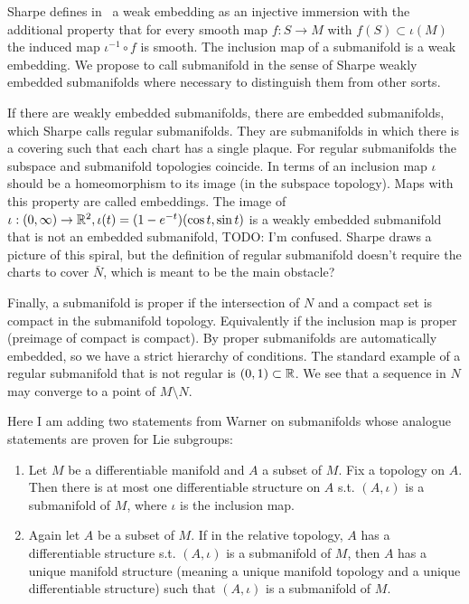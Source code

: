 Sharpe defines in~\cite[Definition~1.1.4]{Sharpe1997} a weak embedding as an injective immersion with the additional property that for every smooth map $f : S \to M$ with $f(S) \subset \iota(M)$ the induced map $\iota^{-1} \circ f$ is smooth.
The inclusion map of a submanifold is a weak embedding.
We propose to call submanifold in the sense of Sharpe weakly embedded submanifolds where necessary to distinguish them from other sorts.

If there are weakly embedded submanifolds, there are embedded submanifolds, which Sharpe calls regular submanifolds.
They are submanifolds in which there is a covering such that each chart has a single plaque.
For regular submanifolds the subspace and submanifold topologies coincide.
In terms of an inclusion map $\iota$ should be a homeomorphism to its image (in the subspace topology).
Maps with this property are called embeddings.
The image of $\iota : (0,\infty) \to \mathbb{R}^2, \iota(t) = (1-e^{-t})(\cos t, \sin t)$ is a weakly embedded submanifold that is not an embedded submanifold, 
TODO: I'm confused. Sharpe draws a picture of this spiral, but the definition of regular submanifold doesn't require the charts to cover $\bar{N}$, which is meant to be the main obstacle?

Finally, a submanifold is proper if the intersection of $N$ and a compact set is compact in the submanifold topology.
Equivalently if the inclusion map is proper (preimage of compact is compact).
By \cite[Theorem~1.2.11]{Sharpe1997} proper submanifolds are automatically embedded, so we have a strict hierarchy of conditions.
The standard example of a regular submanifold that is not regular is $(0,1) \subset \mathbb{R}$.
We see that a sequence in $N$ may converge to a point of $M\setminus N$.

Here I am adding two statements from Warner on submanifolds whose analogue statements are proven for Lie subgroups: 
\begin{theorem}\label{thm:submanifolds}
\textup{\cite[1.33]{Warner1983}}
\begin{enumerate}
\item Let $M$ be a differentiable manifold and $A$ a subset of $M$. Fix a topology on $A$. Then there is at most one differentiable structure on $A$ s.t. $(A,\iota)$ is a submanifold of $M$, where $\iota$ is the inclusion map.
\item Again let $A$ be a subset of $M$. If in the relative topology, $A$ has a differentiable structure s.t. $(A,\iota)$ is a submanifold of $M$, then $A$ has a unique manifold structure (meaning a unique manifold topology and a unique differentiable structure) such that $(A,\iota)$ is a submanifold of $M$.
\end{enumerate}
\end{theorem}

